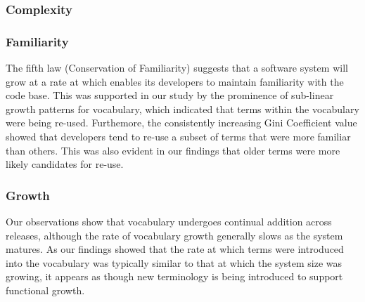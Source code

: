 
\subsubsection{Complexity} %
\label{ssub:complexity}





\subsubsection{Familiarity} %
\label{ssub:familiarity}

The fifth law (Conservation of Familiarity) suggests that a software system will grow at a rate at which enables its developers to maintain familiarity with the code base. This was supported in our study by the prominence of sub-linear growth patterns for vocabulary, which indicated that terms within the vocabulary were being re-used. Furthemore, the consistently increasing Gini Coefficient value showed that developers tend to re-use a subset of terms that were more familiar than others. This was also evident in our findings that older terms were more likely candidates for re-use.


\subsubsection{Growth} %
\label{ssub:growth}

Our observations show that vocabulary undergoes continual addition across releases, although the rate of vocabulary growth generally slows as the system matures. As our findings showed that the rate at which terms were introduced into the vocabulary was typically similar to that at which the system size was growing, it appears as though new terminology is being introduced to support functional growth.


% 
% 

